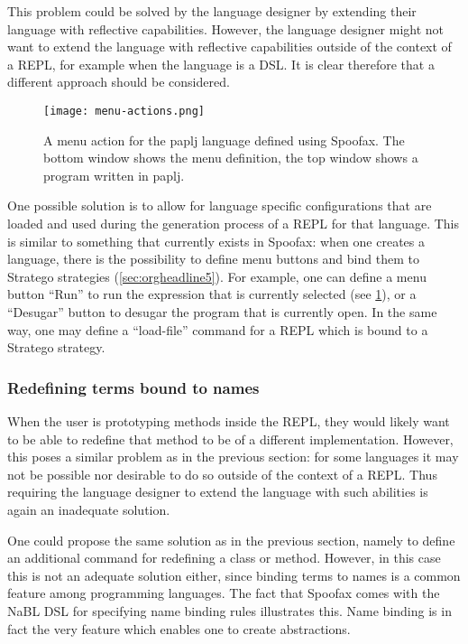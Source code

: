 This problem could be solved by the language designer by extending
their language with reflective capabilities. However, the language
designer might not want to extend the language with reflective
capabilities outside of the context of a REPL, for example when the
language is a DSL. It is clear therefore that a different approach
should be considered.

\begin{figure}[htbp]
  \centering
  \texttt{[image: menu-actions.png]}
  \caption{A menu action for the paplj language defined using
    Spoofax. The bottom window shows the menu definition, the top
    window shows a program written in paplj.}
  \label{fig:menu-actions}
\end{figure}

One possible solution is to allow for language specific configurations
that are loaded and used during the generation process of a REPL for
that language. This is similar to something that currently exists in
Spoofax: when one creates a language, there is the possibility to
define menu buttons and bind them to Stratego strategies
(\cref{sec:orgheadline5}). For example, one can define a menu button
``Run'' to run the expression that is currently selected (see
\cref{fig:menu-actions}), or a ``Desugar'' button to desugar the
program that is currently open. In the same way, one may define a
``load-file'' command for a REPL which is bound to a Stratego
strategy.

\subsubsection{Redefining terms bound to names}
\label{sec:redef-cont-bound}
When the user is prototyping methods inside the REPL, they would
likely want to be able to redefine that method to be of a different
implementation. However, this poses a similar problem as in the
previous section: for some languages it may not be possible nor
desirable to do so outside of the context of a REPL. Thus requiring
the language designer to extend the language with such abilities is
again an inadequate solution.

One could propose the same solution as in the previous section, namely
to define an additional command for redefining a class or
method. However, in this case this is not an adequate solution either,
since binding terms to names is a common feature among programming
languages. The fact that Spoofax comes with the NaBL DSL for
specifying name binding rules illustrates this. Name binding is in
fact the very feature which enables one to create abstractions.

